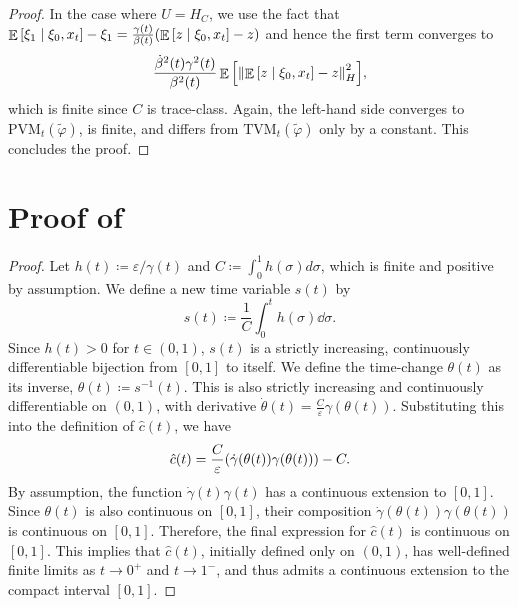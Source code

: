 \begin{proof}
  In the case where \(U = H_{C}\), we use the fact that \(\mathop{\mathbb{E}}\qty[\xi_{1} \mid \xi_{0}, x_{t}] - \xi_{1} = \frac{\gamma(t)}{\beta(t)}\qty(\mathop{\mathbb{E}}\qty[z \mid \xi_{0}, x_{t}] - z)\) and hence the first term converges to
  \[
    \frac{\dot{\beta}^{2}(t) \gamma^{2}(t)}{\beta^{2}(t)} \mathop{\mathbb{E}}\qty[\norm{\mathop{\mathbb{E}}\qty[z \mid \xi_{0}, x_{t}] - z}^{2}_{H}],
  \]
  which is finite since \(C\) is trace-class. Again, the left-hand side converges to \(\mathrm{PVM}_{t}(\widetilde{\varphi})\), is finite, and differs from \(\mathrm{TVM}_{t}(\widetilde{\varphi})\) only by a constant. This concludes the proof.
\end{proof}

\section{Proof of } \label{prf:lem:tc}
\restatelemtc*
\begin{proof}
  Let \(h(t) \coloneqq \varepsilon/\gamma(t)\) and \(C \coloneqq \int_0^1 h(\sigma) d\sigma\), which is finite and positive by assumption. We define a new time variable \(s(t)\) by
  \[ s(t) \coloneqq \frac{1}{C} \int_{0}^{t} h(\sigma) \dd{\sigma}. \]
  Since \(h(t) > 0\) for \(t \in (0, 1)\), \(s(t)\) is a strictly increasing, continuously differentiable bijection from \([0, 1]\) to itself. We define the time-change \(\theta(t)\) as its inverse, \(\theta(t) \coloneqq s^{-1}(t)\). This is also strictly increasing and continuously differentiable on \((0, 1)\), with derivative \(
  \dot{\theta}(t) = \frac{C}{\varepsilon} \gamma(\theta(t))\).
  Substituting this into the definition of \(\hat{c}(t)\), we have
  \[
    \hat{c}(t) = \frac{C}{\varepsilon} \qty(\dot{\gamma}(\theta(t)) \gamma(\theta(t))) - C.
  \]
  By assumption, the function \(\dot{\gamma}(t)\gamma(t)\) has a continuous extension to \([0, 1]\). Since \(\theta(t)\) is also continuous on \([0, 1]\), their composition \(\dot{\gamma}(\theta(t))\gamma(\theta(t))\) is continuous on \([0, 1]\). Therefore, the final expression for \(\hat{c}(t)\) is continuous on \([0, 1]\). This implies that \(\hat{c}(t)\), initially defined only on \((0, 1)\), has well-defined finite limits as \(t \to 0^+\) and \(t \to 1^-\), and thus admits a continuous extension to the compact interval \([0, 1]\).
\end{proof}

